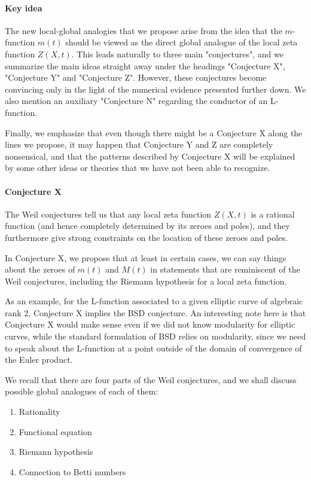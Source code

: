 \documentclass[paper=a4, fontsize=11pt]{scrartcl} %
\numberwithin{equation}{section} %
\numberwithin{figure}{section} %
\numberwithin{table}{section} %
\begin{document}
\paragraph{Key idea}
The new local-global analogies that we propose arise from the idea that the $m$-function $m(t)$ should be viewed as the direct global analogue of the local zeta function $Z(X, t)$. This leads naturally to three main "conjectures", and we summarize the main ideas straight away under the headings "Conjecture X", "Conjecture Y" and "Conjecture Z". However, these conjectures become convincing only in the light of the numerical evidence presented further down. We also mention an auxiliary "Conjecture N" regarding the conductor of an L-function.

Finally, we emphasize that even though there might be a Conjecture X along the lines we propose, it may happen that Conjecture Y and Z are completely nonsensical, and that the patterns described by Conjecture X will be explained by some other ideas or theories that we have not been able to recognize.

\paragraph{Conjecture X}

The Weil conjectures tell us that any local zeta function $Z(X, t)$ is a rational function (and hence completely determined by its zeroes and poles), and they furthermore give strong constraints on the location of these zeroes and poles.

In Conjecture X, we propose that at least in certain cases, we can say things about the zeroes of $m(t)$ and $M(t)$ in statements that are reminiscent of the Weil conjectures, including the Riemann hypothesis for a local zeta function.

As an example, for the L-function associated to a given elliptic curve of algebraic rank 2, Conjecture X implies the BSD conjecture. An interesting note here is that Conjecture X would make sense even if we did not know modularity for elliptic curves, while the standard formulation of BSD relies on modularity, since we need to speak about the L-function at a point outside of the domain of convergence of the Euler product.

We recall that there are four parts of the Weil conjectures, and we shall discuss possible global analogues of each of them:

\begin{enumerate}
\item Rationality
\item Functional equation
\item Riemann hypothesis
\item Connection to Betti numbers
\end{enumerate}
\end{document}
